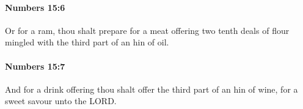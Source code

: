 		\paragraph{Numbers 15:6} %
			\label{NUMBERS-15-6}

			Or for a ram, thou shalt prepare for a meat offering two tenth deals of flour mingled with the third part of an hin of oil.


		\paragraph{Numbers 15:7} %
			\label{NUMBERS-15-7}

			And for a drink offering thou shalt offer the third part of an hin of wine, for a sweet savour unto the LORD.


